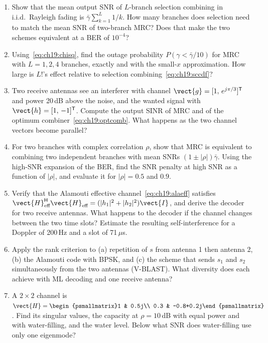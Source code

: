 \problems
\begin{enumerate}[label=\thechapter.\arabic*]
\item Show that the mean output SNR of $L$-branch selection combining in i.i.d.\ Rayleigh fading is
$\bar\gamma\sum_{k=1}^L1/k$. How many branches does selection need to match the mean SNR of
two-branch MRC? Does that make the two schemes equivalent at a BER of $10^{-4}$?
\item Using~\eqref{eq:ch19:chisq}, find the outage probability $P(\gamma<\bar\gamma/10)$ for MRC with
$L=1,2,4$ branches, exactly and with the small-$x$ approximation. How large is $L!$'s effect relative
to selection combining~\eqref{eq:ch19:sccdf}?
\item Two receive antennas see an interferer with channel $\vect{g}=[1,\,e^{j\pi/3}]^{\mathsf T}$ and
power 20\,dB above the noise, and the wanted signal with $\vect{h}=[1,\,-1]^{\mathsf T}$. Compute the
output SINR of MRC and of the optimum combiner~\eqref{eq:ch19:optcomb}. What happens as the two
channel vectors become parallel?
\item For two branches with complex correlation $\rho$, show that MRC is equivalent to combining two
independent branches with mean SNRs $(1\pm|\rho|)\bar\gamma$. Using the high-SNR expansion of the
BER, find the SNR penalty at high SNR as a function of $|\rho|$, and evaluate it for $|\rho|=0.5$ and
$0.9$.
\item Verify that the Alamouti effective channel~\eqref{eq:ch19:alaeff} satisfies
$\vect{H}_{\text{eff}}^{\mathsf H}\vect{H}_{\text{eff}}=(|h_1|^2+|h_2|^2)\vect{I}$, and derive the decoder for
two receive antennas. What happens to the decoder if the channel changes between the two time
slots? Estimate the resulting self-interference for a Doppler of 200\,Hz and a slot of 71\,$\mu$s.
\item Apply the rank criterion to (a) repetition of $s$ from antenna 1 then antenna 2, (b) the
Alamouti code with BPSK, and (c) the scheme that sends $s_1$ and $s_2$ simultaneously from the two
antennas (V-BLAST). What diversity does each achieve with ML decoding and one receive antenna?
\item A $2\times2$ channel is
$\vect{H}=\begin{psmallmatrix}1 & 0.5j\\ 0.3 & -0.8+0.2j\end{psmallmatrix}$. Find its singular values,
the capacity at $\rho=10$\,dB with equal power and with water-filling, and the water level. Below what
SNR does water-filling use only one eigenmode?

\end{enumerate}
